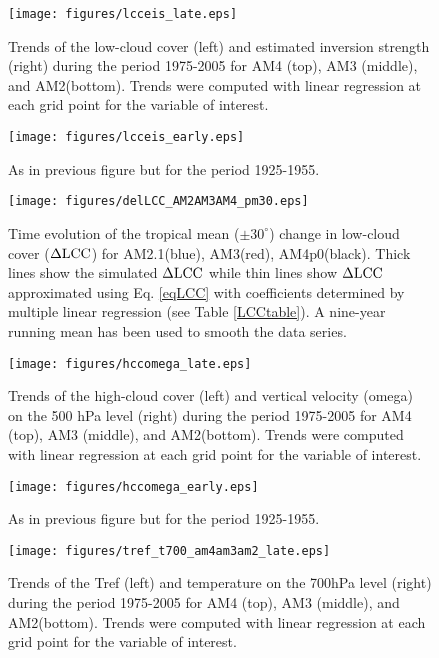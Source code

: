\documentclass[grl]{agutex2015}
\begin{document}
\begin{figure}
  \texttt{[image: figures/lcceis\_late.eps]}
  \caption{Trends of the low-cloud cover (left) and estimated inversion strength (right) during the period 1975-2005 for AM4 (top), AM3 (middle), and AM2(bottom).  Trends were computed with linear regression at each grid point for the variable of interest.}
  \label{fig:lcceis_late}
\end{figure}

\begin{figure}
  \texttt{[image: figures/lcceis\_early.eps]}
  \caption{As in previous figure but for the period 1925-1955.}
  \label{fig:lcceis_early}
\end{figure}

\begin{figure}
  \texttt{[image: figures/delLCC\_AM2AM3AM4\_pm30.eps]}
  \caption{Time evolution of the tropical mean ($\pm 30^{\circ}$) change in low-cloud cover ($\Delta \rm{LCC}$) for AM2.1(blue), AM3(red), AM4p0(black).  Thick lines show the       simulated $\Delta \rm{LCC}$ while thin lines show $\Delta \rm{LCC}$ approximated using Eq. \ref{eqLCC} with coefficients determined by multiple linear regression (see Table \ref{LCCtable}).  A nine-year running mean has been used to smooth the data series.}
  \label{fig:lccts}
\end{figure}


\begin{figure}
  \texttt{[image: figures/hccomega\_late.eps]}
  \caption{Trends of the high-cloud cover (left) and vertical velocity (omega) on the 500 hPa level (right) during the period 1975-2005 for 
                AM4 (top), AM3 (middle), and AM2(bottom).  Trends were computed with linear regression at each grid point for the variable of 
                interest.}
  \label{fig:hccomega_late}
\end{figure}

\begin{figure}
  \texttt{[image: figures/hccomega\_early.eps]}
  \caption{As in previous figure but for the period 1925-1955.}
  \label{fig:hccomega_late}
\end{figure}

\begin{figure}
  \texttt{[image: figures/tref\_t700\_am4am3am2\_late.eps]}
  \caption{Trends of the Tref (left) and temperature on the 700hPa level (right) during the period 1975-2005 for AM4 (top), AM3 (middle), and AM2(bottom).  Trends were computed with linear regression at each grid point for the variable of interest.}
  \label{fig:tref_t700_late}
\end{figure}
\end{document}
